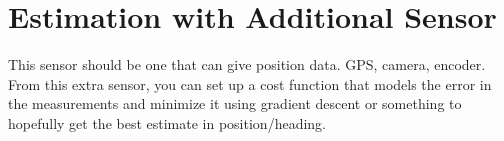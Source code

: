 \section{Estimation with Additional Sensor}

This sensor should be one that can give position data. GPS, camera, encoder.
From this extra sensor, you can set up a cost function that models the error 
in the measurements and minimize it using gradient descent or something to 
hopefully get the best estimate in position/heading. 


